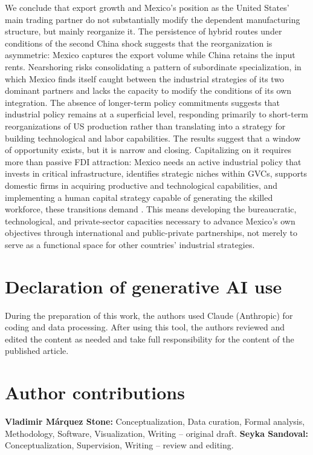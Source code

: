 \documentclass[11pt]{article}
\begin{document}
We conclude that export growth and Mexico's position as the United
States' main trading partner do not substantially modify the dependent
manufacturing structure, but mainly reorganize it. The persistence of
hybrid routes under conditions of the second China shock suggests that
the reorganization is asymmetric: Mexico captures the export
volume while China retains the input rents. Nearshoring risks
consolidating a pattern of subordinate specialization, in which Mexico
finds itself caught between the industrial strategies of its two dominant
partners and lacks the capacity to modify the conditions of its own
integration. The absence of longer-term policy commitments suggests that
industrial policy remains at a superficial level, responding primarily to
short-term reorganizations of US production rather than translating into
a strategy for building technological and labor capabilities. The results
suggest that a window of opportunity exists, but it is narrow and closing.
Capitalizing on it requires more than passive FDI attraction: Mexico needs
an active industrial policy that invests in critical infrastructure,
identifies strategic niches within GVCs, supports domestic firms in
acquiring productive and technological capabilities, and implementing a
human capital strategy capable of generating the skilled workforce, these
transitions demand \citep{Gereffi2025}. This means developing the
bureaucratic, technological, and private-sector capacities necessary to
advance Mexico's own objectives through international and public-private
partnerships, not merely to serve as a functional space for other
countries' industrial strategies.

\section*{Declaration of generative AI use}
During the preparation of this work, the authors used Claude (Anthropic) for coding and data processing. After using this tool, the authors reviewed and edited the
content as needed and take full responsibility for the content of the published article.

\section*{Author contributions}
\textbf{Vladimir Márquez Stone:} Conceptualization, Data curation,
Formal analysis, Methodology, Software, Visualization,
Writing -- original draft.
\textbf{Seyka Sandoval:} Conceptualization, Supervision,
Writing -- review and editing.
\end{document}
